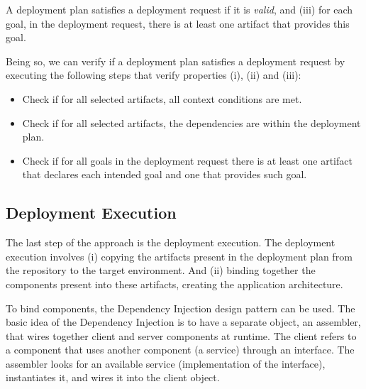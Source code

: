 A deployment plan satisfies a deployment request if it is \emph{valid}, and (iii) for each goal, in the deployment request, there is at least one artifact that provides this goal.

Being so, we can verify if a deployment plan satisfies a deployment request by executing the following steps that verify properties (i), (ii) and (iii):

\begin{itemize}
  \item Check if for all selected artifacts, all context conditions are met.
  \item Check if for all selected artifacts, the dependencies are within the deployment plan.
  \item Check if for all goals in the deployment request there is at least one artifact that declares each intended goal and one that provides such goal.
\end{itemize}

\subsection{Deployment Execution}

The last step of the approach is the deployment execution. The deployment execution involves (i) copying the artifacts present in the deployment plan from the repository to the target environment. And (ii) binding together the components present into these artifacts, creating the application architecture.

To bind components, the Dependency Injection\cite{fowler_inversion_2004} design pattern can be used. The basic idea of the Dependency Injection is to have a separate object, an assembler, that wires together client and server components at runtime\cite{fowler_inversion_2004}. The client refers to a component that uses another component (a service) through an interface. The assembler looks for an available service (implementation of the interface), instantiates it, and wires it into the client object.
